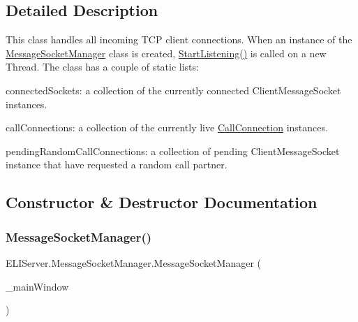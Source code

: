 \subsection{Detailed Description}
This class handles all incoming T\+CP client connections. When an instance of the \hyperlink{class_e_l_i_server_1_1_message_socket_manager}{Message\+Socket\+Manager} class is created, \hyperlink{class_e_l_i_server_1_1_message_socket_manager_ab5d2f61a349046960ae63303ff1c2130}{Start\+Listening()} is called on a new Thread. The class has a couple of static lists\+: 


\begin{DoxyItemize}
\item connected\+Sockets\+: a collection of the currently connected Client\+Message\+Socket instances.
\item call\+Connections\+: a collection of the currently live \hyperlink{class_e_l_i_server_1_1_call_connection}{Call\+Connection} instances.
\item pending\+Random\+Call\+Connections\+: a collection of pending Client\+Message\+Socket instance that have requested a random call partner. 
\end{DoxyItemize}

\subsection{Constructor \& Destructor Documentation}
\mbox{\label{class_e_l_i_server_1_1_message_socket_manager_a28b6d0e215aa417970fc82b9239bebbb}} 
\subsubsection{\texorpdfstring{Message\+Socket\+Manager()}{MessageSocketManager()}}
{\footnotesize\ttfamily E\+L\+I\+Server.\+Message\+Socket\+Manager.\+Message\+Socket\+Manager (\begin{DoxyParamCaption}\item[{\hyperlink{class_e_l_i_server_1_1_main_window}{Main\+Window}}]{\+\_\+main\+Window }\end{DoxyParamCaption})\hspace{0.3cm}{\ttfamily [inline]}}




